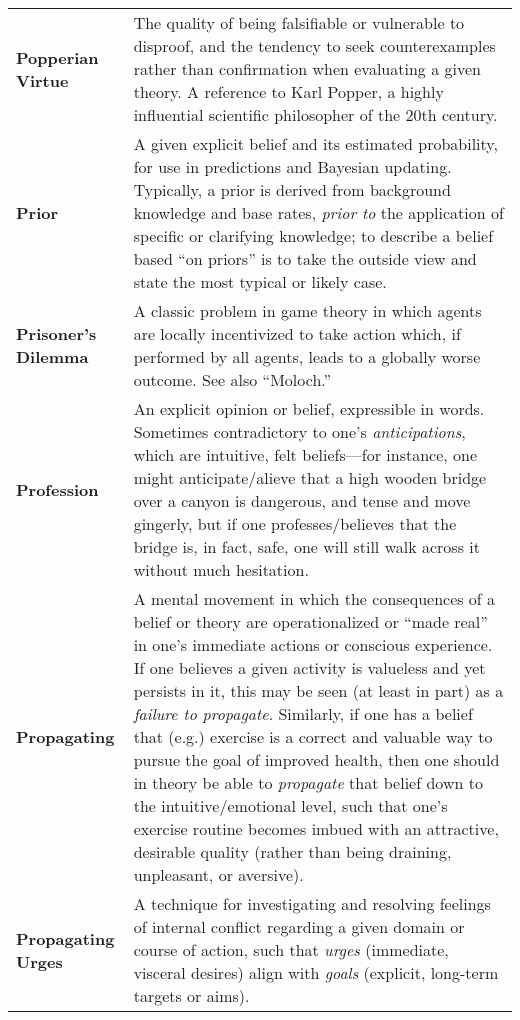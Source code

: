 \begin{longtable} { p{} p{} }
\textbf{Popperian Virtue} & The quality of being falsifiable or vulnerable to disproof, and the tendency to seek counterexamples rather than confirmation when evaluating a given theory.  A reference to Karl Popper, a highly influential scientific philosopher of the 20th century.\\

\textbf{Prior} & A given explicit belief and its estimated probability, for use in predictions and Bayesian updating.  Typically, a prior is derived from background knowledge and base rates, \emph{prior to} the application of specific or clarifying knowledge; to describe a belief based ``on priors'' is to take the outside view and state the most typical or likely case.\\

\textbf{Prisoner's Dilemma} & A classic problem in game theory in which agents are locally incentivized to take action which, if performed by all agents, leads to a globally worse outcome.  See also ``Moloch.''\\

\textbf{Profession} & An explicit opinion or belief, expressible in words.  Sometimes contradictory to one's \emph{anticipations}, which are intuitive, felt beliefs---for instance, one might anticipate/alieve that a high wooden bridge over a canyon is dangerous, and tense and move gingerly, but if one professes/believes that the bridge is, in fact, safe, one will still walk across it without much hesitation.\\

\textbf{Propagating} & A mental movement in which the consequences of a belief or theory are operationalized or ``made real'' in one's immediate actions or conscious experience.  If one believes a given activity is valueless and yet persists in it, this may be seen (at least in part) as a \emph{failure to propagate}.  Similarly, if one has a belief that (e.g.) exercise is a correct and valuable way to pursue the goal of improved health, then one should in theory be able to \emph{propagate} that belief down to the intuitive/emotional level, such that one's exercise routine becomes imbued with an attractive, desirable quality (rather than being draining, unpleasant, or aversive).\\

\textbf{Propagating Urges} & A technique for investigating and resolving feelings of internal conflict regarding a given domain or course of action, such that \emph{urges} (immediate, visceral desires) align with \emph{goals} (explicit, long-term targets or aims).\\


\end{longtable}
